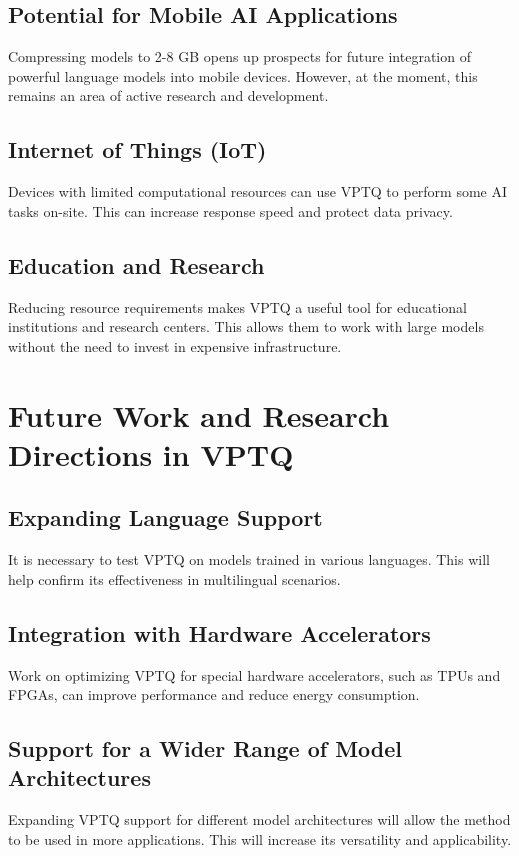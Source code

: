 \documentclass{article}
\begin{document}
\subsection{Potential for Mobile AI Applications}
Compressing models to 2-8 GB opens up prospects for future integration of powerful language models into mobile devices. However, at the moment, this remains an area of active research and development.

\subsection{Internet of Things (IoT)}
Devices with limited computational resources can use VPTQ to perform some AI tasks on-site. This can increase response speed and protect data privacy.

\subsection{Education and Research}
Reducing resource requirements makes VPTQ a useful tool for educational institutions and research centers. This allows them to work with large models without the need to invest in expensive infrastructure.

\section{Future Work and Research Directions in VPTQ}

\subsection{Expanding Language Support}
It is necessary to test VPTQ on models trained in various languages. This will help confirm its effectiveness in multilingual scenarios.

\subsection{Integration with Hardware Accelerators}
Work on optimizing VPTQ for special hardware accelerators, such as TPUs and FPGAs, can improve performance and reduce energy consumption.

\subsection{Support for a Wider Range of Model Architectures}
Expanding VPTQ support for different model architectures will allow the method to be used in more applications. This will increase its versatility and applicability.
\end{document}

